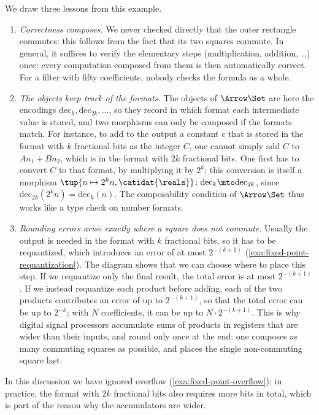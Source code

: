 We draw three lessons from this example.
\begin{enumerate}
    \item \emph{Correctness composes.}
          We never checked directly that the outer rectangle commutes: this follows from the fact that its two squares commute.
          In general, it suffices to verify the elementary steps (multiplication, addition, \dots) once; every computation composed from them is then automatically correct.
          For a filter with fifty coefficients, nobody checks the formula as a whole.
    \item \emph{The objects keep track of the formats.}
          The objects of $\Arrow\Set$ are here the encodings $\mathrm{dec}_k, \mathrm{dec}_{2k}, \dots$, so they record in which format each intermediate value is stored, and two morphisms can only be composed if the formats match.
          For instance, to add to the output a constant $c$ that is stored in the format with $k$ fractional bits as the integer $C$, one cannot simply add $C$ to $A n_1 + B n_2$, which is in the format with $2k$ fractional bits.
          One first has to convert $C$ to that format, by multiplying it by $2^k$; this conversion is itself a morphism $\tup{n \mapsto 2^k n, \catidat{\reals}} \colon \mathrm{dec}_k \mto \mathrm{dec}_{2k}$, since $\mathrm{dec}_{2k}(2^k n) = \mathrm{dec}_k(n)$.
          The composability condition of $\Arrow\Set$ thus works like a type check on number formats.
    \item \emph{Rounding errors arise exactly where a square does not commute.}
          Usually the output is needed in the format with $k$ fractional bits, so it has to be requantized, which introduces an error of at most $2^{-(k+1)}$ (\cref{exa:fixed-point-requantization}).
          The diagram shows that we can choose where to place this step.
          If we requantize only the final result, the total error is at most $2^{-(k+1)}$.
          If we instead requantize each product before adding, each of the two products contributes an error of up to $2^{-(k+1)}$, so that the total error can be up to $2^{-k}$; with $N$ coefficients, it can be up to $N \cdot 2^{-(k+1)}$.
          This is why digital signal processors accumulate sums of products in registers that are wider than their inputs, and round only once at the end: one composes as many commuting squares as possible, and places the single non-commuting square last.
\end{enumerate}
In this discussion we have ignored overflow (\cref{exa:fixed-point-overflow}); in practice, the format with $2k$ fractional bits also requires more bits in total, which is part of the reason why the accumulators are wider.

